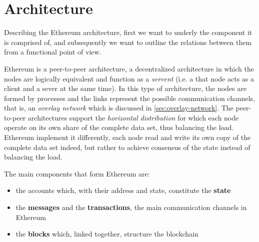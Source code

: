 \section{Architecture}

Describing the Ethereum architecture, first we want to underly the component it
is comprised of, and subsequently we want to outline the relations between them
from a functional point of view.

Ethereum is a peer-to-peer architecture, a decentralized architecture in which
the nodes are logically equivalent and function as a \emph{servent} (i.e. a that
node acts as a client and a sever at the same time). In this type of
architecture, the nodes are formed by processes and the links represent the
possible communication channels, that is, an \emph{overlay network}
\cite{van2017distributed} which is discussed in \autoref{sec:overlay-network}.
The peer-to-peer architectures support the \emph{horizontal distribution} for
which each node operate on its own share of the complete data set, thus
balancing the load. Ethereum implement it differently, each node read and write
its own copy of the complete data set indeed, but rather to achieve consensus of
the state instead of balancing the load.

The main components that form Ethereum are:

\begin{itemize}
  \item the accounts which, with their address and state, constitute the \textbf{state}
  \item the \textbf{messages} and the \textbf{transactions}, the main
  communication channels in Ethereum
  \item the \textbf{blocks} which, linked together, structure the blockchain
\end{itemize}


